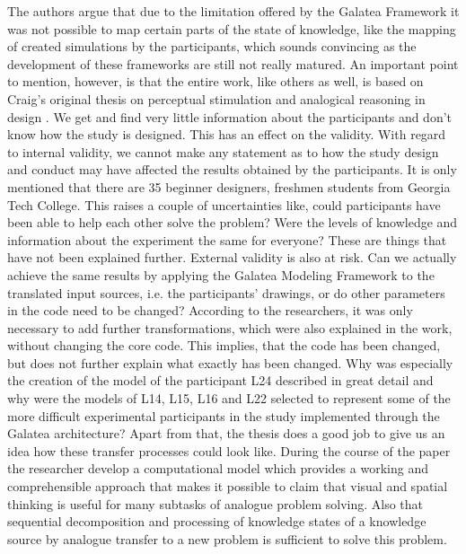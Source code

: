 \documentclass[12pt]{article}
\begin{document}
The authors argue that due to the limitation offered by the Galatea Framework it was not possible to map certain parts of the state of knowledge, like the mapping of created simulations by the participants, which sounds convincing as the development of these frameworks are still not really matured. An important point to mention, however, is that the entire work, like others as well, is based on Craig's original thesis on perceptual stimulation and analogical reasoning in design \cite{craig2001perceptual}. We get and find very little information about the participants and don't know how the study is designed. This has an effect on the validity. With regard to internal validity, we cannot make any statement as to how the study design and conduct may have affected the results obtained by the participants. It is only mentioned that there are 35 beginner designers, freshmen students from Georgia Tech College. This raises a couple of uncertainties like, could participants have been able to help each other solve the problem? Were the levels of knowledge and information about the experiment the same for everyone? These are things that have not been explained further. External validity is also at risk. Can we actually achieve the same results by applying the Galatea Modeling Framework to the translated input sources, i.e. the participants' drawings, or do other parameters in the code need to be changed? According to the researchers, it was only necessary to add further transformations, which were also explained in the work, without changing the core code. This implies, that the code has been changed, but does not further explain what exactly has been changed. Why was especially the creation of the model of the participant L24 described in great detail and why were the models of L14, L15, L16 and L22 selected to represent some of the more difficult experimental participants in the study implemented through the Galatea architecture? Apart from that, the thesis does a good job to give us an idea how these transfer processes could look like. During the course of the paper the researcher develop a computational model which provides a working and comprehensible approach that makes it possible to claim that visual and spatial thinking is useful for many subtasks of analogue problem solving. Also that sequential decomposition and processing of knowledge states of a knowledge source by analogue transfer to a new problem is sufficient to solve this problem.


\noindent
\newpage



\end{document}
